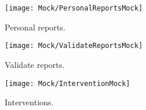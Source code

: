 \begin{figure}[H]
	\centering
		\begin{minipage}[b]{0.4\linewidth}
	    \texttt{[image: Mock/PersonalReportsMock]}
	    \caption{Personal reports.}
	\end{minipage}
	\begin{minipage}[b]{0.4\linewidth}
	    \texttt{[image: Mock/ValidateReportsMock]}
	    \caption{Validate reports.}
	\end{minipage}
\end{figure}
\begin{figure}[htbp]
	\centering
	\begin{minipage}[b]{0.4\linewidth}
	    \texttt{[image: Mock/InterventionMock]}
	    \caption{Interventions.}
	\end{minipage}
\end{figure}




